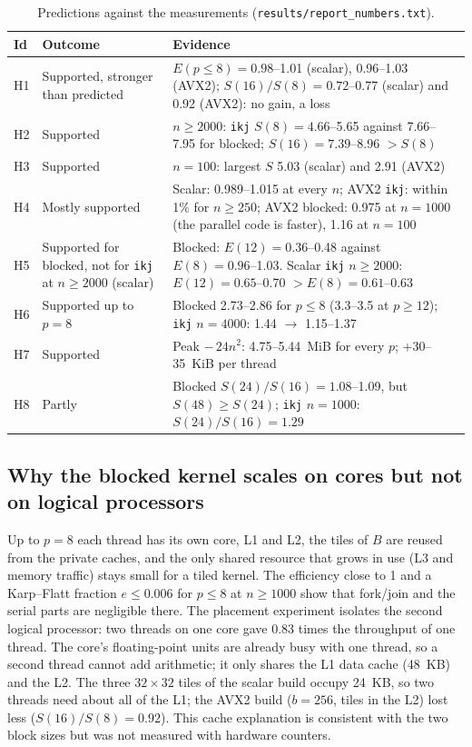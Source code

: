 \documentclass[11pt,a4paper]{article}
\begin{document}
\begin{table}[H]
\centering
\small
\setlength{\tabcolsep}{4pt}
\begin{tabular}{>{\raggedright\arraybackslash}p{0.7cm}>{\raggedright\arraybackslash}p{3.3cm}p{11cm}}
\toprule
\textbf{Id} & \textbf{Outcome} & \textbf{Evidence} \\
\midrule
H1 & Supported, stronger than predicted & $E(p \le 8) = 0.98$--1.01 (scalar), 0.96--1.03
(AVX2); $S(16)/S(8) = 0.72$--0.77 (scalar) and 0.92 (AVX2): no gain, a loss \\
H2 & Supported & $n \ge 2000$: \texttt{ikj} $S(8) = 4.66$--5.65 against 7.66--7.95 for
blocked; $S(16) = 7.39$--8.96 $> S(8)$ \\
H3 & Supported & $n = 100$: largest $S$ 5.03 (scalar) and 2.91 (AVX2) \\
H4 & Mostly supported & Scalar: 0.989--1.015 at every $n$; AVX2 \texttt{ikj}: within 1\% for
$n \ge 250$; AVX2 blocked: 0.975 at $n = 1000$ (the parallel code is faster), 1.16 at
$n = 100$ \\
H5 & Supported for blocked, not for \texttt{ikj} at $n \ge 2000$ (scalar) & Blocked:
$E(12) = 0.36$--0.48 against $E(8) = 0.96$--1.03. Scalar \texttt{ikj} $n \ge 2000$:
$E(12) = 0.65$--0.70 $> E(8) = 0.61$--0.63 \\
H6 & Supported up to $p = 8$ & Blocked 2.73--2.86 for $p \le 8$ (3.3--3.5 at $p \ge 12$);
\texttt{ikj} $n = 4000$: 1.44 $\to$ 1.15--1.37 \\
H7 & Supported & Peak $-\,24n^2$: 4.75--5.44~MiB for every $p$; $+30$--35~KiB per thread \\
H8 & Partly & Blocked $S(24)/S(16) = 1.08$--1.09, but $S(48) \ge S(24)$; \texttt{ikj}
$n = 1000$: $S(24)/S(16) = 1.29$ \\
\bottomrule
\end{tabular}
\caption{Predictions against the measurements (\texttt{results/report\_numbers.txt}).}
\label{tab:hyp}
\end{table}

\subsection{Why the blocked kernel scales on cores but not on logical processors}

Up to $p = 8$ each thread has its own core, L1 and L2, the tiles of $B$ are reused from
the private caches, and the only shared resource that grows in use (L3 and memory traffic)
stays small for a tiled kernel. The efficiency close to 1 and a Karp--Flatt fraction
$e \le 0.006$ for $p \le 8$ at $n \ge 1000$ show that fork/join and the serial parts are negligible
there. The placement experiment isolates the second logical processor: two threads on one
core gave 0.83 times the throughput of one thread. The core's floating-point units are
already busy with one thread, so a second thread cannot add arithmetic; it only shares the
L1 data cache (48~KB) and the L2. The three $32 \times 32$ tiles of the scalar build occupy
24~KB, so two threads need about all of the L1; the AVX2 build ($b = 256$, tiles in the L2)
lost less ($S(16)/S(8) = 0.92$). This cache explanation is consistent with the two block
sizes but was not measured with hardware counters.
\end{document}
